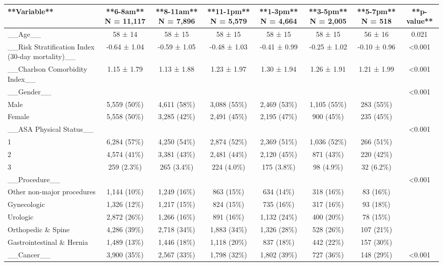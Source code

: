 
\begin{tabular}{lccccccc}
\toprule
**Variable** & **6-8am**  N = 11,117 & **8-11am**  N = 7,896 & **11-1pm**  N = 5,579 & **1-3pm**  N = 4,664 & **3-5pm**  N = 2,005 & **5-7pm**  N = 518 & **p-value**\\
\midrule
\_\_Age\_\_ & 58 ± 14 & 58 ± 15 & 58 ± 15 & 58 ± 15 & 58 ± 15 & 56 ± 16 & 0.021\\
\_\_Risk Stratification Index (30-day mortality)\_\_ & -0.64 ± 1.04 & -0.59 ± 1.05 & -0.48 ± 1.03 & -0.41 ± 0.99 & -0.25 ± 1.02 & -0.10 ± 0.96 & <0.001\\
\_\_Charlson Comorbidity Index\_\_ & 1.15 ± 1.79 & 1.13 ± 1.88 & 1.23 ± 1.97 & 1.30 ± 1.94 & 1.26 ± 1.91 & 1.21 ± 1.99 & <0.001\\
\_\_Gender\_\_ &  &  &  &  &  &  & <0.001\\
Male & 5,559 (50\%) & 4,611 (58\%) & 3,088 (55\%) & 2,469 (53\%) & 1,105 (55\%) & 283 (55\%) & \\
Female & 5,558 (50\%) & 3,285 (42\%) & 2,491 (45\%) & 2,195 (47\%) & 900 (45\%) & 235 (45\%) & \\
\_\_ASA Physical Status\_\_ &  &  &  &  &  &  & <0.001\\
1 & 6,284 (57\%) & 4,250 (54\%) & 2,874 (52\%) & 2,369 (51\%) & 1,036 (52\%) & 266 (51\%) & \\
2 & 4,574 (41\%) & 3,381 (43\%) & 2,481 (44\%) & 2,120 (45\%) & 871 (43\%) & 220 (42\%) & \\
3 & 259 (2.3\%) & 265 (3.4\%) & 224 (4.0\%) & 175 (3.8\%) & 98 (4.9\%) & 32 (6.2\%) & \\
\_\_Procedure\_\_ &  &  &  &  &  &  & <0.001\\
Other non-major procedures & 1,144 (10\%) & 1,249 (16\%) & 863 (15\%) & 634 (14\%) & 318 (16\%) & 83 (16\%) & \\
Gynecologic & 1,326 (12\%) & 1,217 (15\%) & 824 (15\%) & 735 (16\%) & 317 (16\%) & 93 (18\%) & \\
Urologic & 2,872 (26\%) & 1,266 (16\%) & 891 (16\%) & 1,132 (24\%) & 400 (20\%) & 78 (15\%) & \\
Orthopedic \& Spine & 4,286 (39\%) & 2,718 (34\%) & 1,883 (34\%) & 1,326 (28\%) & 528 (26\%) & 107 (21\%) & \\
Gastrointestinal \& Hernia & 1,489 (13\%) & 1,446 (18\%) & 1,118 (20\%) & 837 (18\%) & 442 (22\%) & 157 (30\%) & \\
\_\_Cancer\_\_ & 3,900 (35\%) & 2,567 (33\%) & 1,798 (32\%) & 1,802 (39\%) & 727 (36\%) & 148 (29\%) & <0.001\\

\end{tabular}
